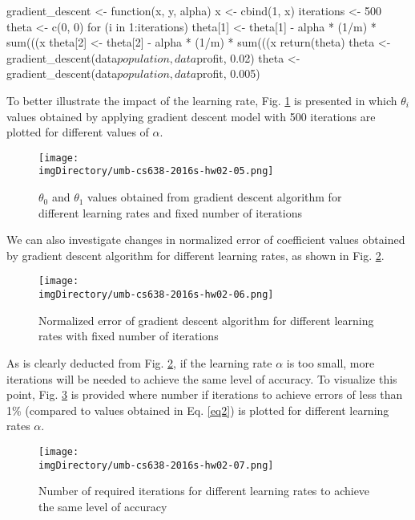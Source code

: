 \documentclass[12pt,letterpaper,twoside]{article}
\begin{document}
\begin{terminal}
gradient_descent <- function(x, y, alpha) {
	x <- cbind(1, x)
	iterations <- 500
	theta <- c(0, 0)
	for (i in 1:iterations)
	{
		theta[1] <- theta[1] - alpha * (1/m) * sum(((x%
		theta[2] <- theta[2] - alpha * (1/m) * sum(((x%
	}
	return(theta)
}
theta <- gradient_descent(data$population, data$profit, 0.02)
theta <- gradient_descent(data$population, data$profit, 0.005)
\end{terminal}

To better illustrate the impact of the learning rate, Fig. \ref{fig3} is presented in which $\theta_i$ values obtained by applying gradient descent model with 500 iterations are plotted for different values of $\alpha$.

\begin{figure}\centering
\texttt{[image: \\imgDirectory/umb-cs638-2016s-hw02-05.png]}
\caption{$\theta_0$ and $\theta_1$ values obtained from gradient descent algorithm for different learning rates and fixed number of iterations}\label{fig3}
\end{figure}

We can also investigate changes in normalized error of coefficient values obtained by gradient descent algorithm for different learning rates, as shown in Fig. \ref{fig4}.

\begin{figure}\centering
\texttt{[image: \\imgDirectory/umb-cs638-2016s-hw02-06.png]}
\caption{Normalized error of gradient descent algorithm for different learning rates with fixed number of iterations}\label{fig4}
\end{figure}

As is clearly deducted from Fig. \ref{fig4}, if the learning rate $\alpha$ is too small, more iterations will be needed to achieve the same level of accuracy.
To visualize this point, Fig. \ref{fig5} is provided where number if iterations to achieve errors of less than 1\% (compared to values obtained in Eq. \ref{eq2}) is plotted for different learning rates $\alpha$.

\begin{figure}\centering
\texttt{[image: \\imgDirectory/umb-cs638-2016s-hw02-07.png]}
\caption{Number of required iterations for different learning rates to achieve the same level of accuracy}\label{fig5}
\end{figure}

\newpage
\end{document}
